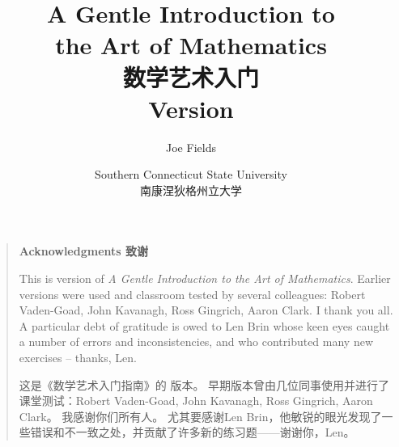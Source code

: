 \documentclass[12pt,twoside]{book}
\begin{document}
\frontmatter

\title{A Gentle Introduction to \\ the Art of Mathematics \\ 数学艺术入门 \\{\small Version \versionNum {} }}
\author{Joe Fields}
\date{Southern Connecticut State University \\ 南康涅狄格州立大学}

\maketitle

\clearpage



\clearpage

\rule{0pt}{0pt}

\vfill

\begin{quote}
  {\Large \bf Acknowledgments 致谢}

  This is version \versionNum of {\em A Gentle Introduction to the Art of Mathematics}.
  Earlier versions were used and classroom tested by several colleagues:
  Robert Vaden-Goad, John Kavanagh, Ross Gingrich, Aaron Clark.
  I thank you all.
  A particular debt of gratitude is owed to Len Brin whose keen eyes caught
  a number of errors and inconsistencies, and who contributed many new
  exercises -- thanks, Len.

  这是《数学艺术入门指南》的 \versionNum 版本。
  早期版本曾由几位同事使用并进行了课堂测试：Robert Vaden-Goad, John Kavanagh, Ross Gingrich, Aaron Clark。
  我感谢你们所有人。
  尤其要感谢Len Brin，他敏锐的眼光发现了一些错误和不一致之处，并贡献了许多新的练习题——谢谢你，Len。
\end{quote}

\vfill


\clearpage

\tableofcontents

\listoffigures

\listoftables

%
%

\mainmatter













{}%


%

{}
\printindex
\end{document}

